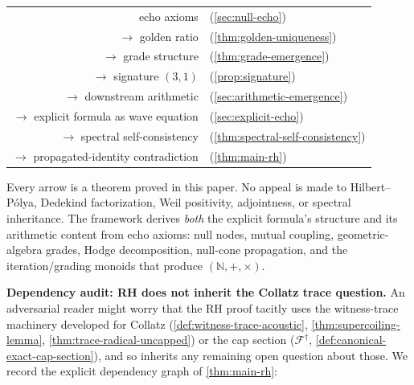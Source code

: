 \documentclass[11pt,a4paper]{article}
\theoremstyle{plain}
\theoremstyle{definition}
\theoremstyle{remark}
\numberwithin{equation}{section}
\newcommand{\Nat}{\mathbb{N}}
\begin{document}
\begin{center}
\begin{tabular}{@{}rl@{}}
  echo axioms & (\cref{sec:null-echo})\\
  \(\to\) golden ratio & (\cref{thm:golden-uniqueness})\\
  \(\to\) grade structure & (\cref{thm:grade-emergence})\\
  \(\to\) signature \((3,1)\) & (\cref{prop:signature})\\
  \(\to\) downstream arithmetic & (\cref{sec:arithmetic-emergence})\\
  \(\to\) explicit formula as wave equation & (\cref{sec:explicit-echo})\\
  \(\to\) spectral self-consistency & (\cref{thm:spectral-self-consistency})\\
  \(\to\) propagated-identity contradiction & (\cref{thm:main-rh})\\
\end{tabular}
\end{center}

\noindent
Every arrow is a theorem proved in this paper.  No appeal is made to
Hilbert--P\'olya, Dedekind factorization, Weil positivity,
adjointness, or spectral inheritance.  The framework derives
\emph{both} the explicit formula's structure and its arithmetic content
from echo axioms: null nodes, mutual coupling, geometric-algebra grades,
Hodge decomposition, null-cone propagation, and the iteration/grading
monoids that produce \((\Nat,+,\times)\).

\medskip\noindent\textbf{Dependency audit: RH does not inherit the
Collatz trace question.}  An adversarial reader might worry that
the RH proof tacitly uses the witness-trace machinery developed for
Collatz (\cref{def:witness-trace-acoustic},
\cref{thm:supercoiling-lemma}, \cref{thm:trace-radical-uncapped})
or the cap section ($\mathcal{F}^{\dagger}$,
\cref{def:canonical-exact-cap-section}), and so inherits any
remaining open question about those.  We record the explicit
dependency graph of \cref{thm:main-rh}:
\end{document}
